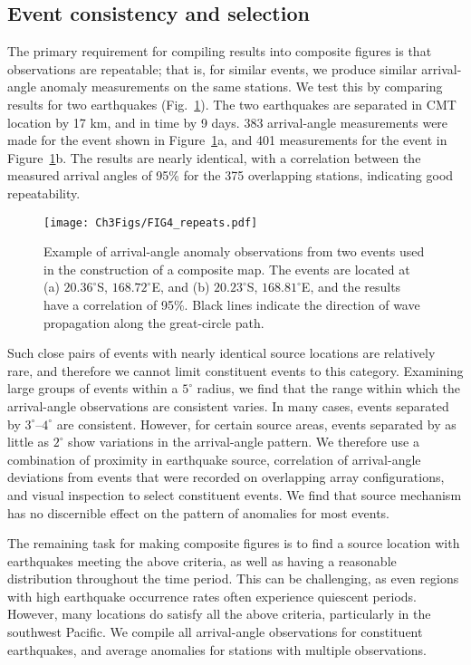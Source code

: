 \documentclass[12pt,oneside]{book}
\newcommand{\degree}[1]{\mbox{$#1^{\circ}$}}
\begin{document}
\subsection{Event consistency and selection}
The primary requirement for compiling results into composite figures is that observations are repeatable; that is, for similar events, we produce similar arrival-angle anomaly measurements on the same stations. We test this by comparing results for two earthquakes (Fig.~\ref{figaa:repeatexample}). The two earthquakes are separated in CMT location by 17 km, and in time by 9 days. 383 arrival-angle measurements were made for the event shown in Figure~\ref{figaa:repeatexample}a, and 401 measurements for the event in Figure~\ref{figaa:repeatexample}b. The results are nearly identical, with a correlation between the measured arrival angles of 95\% for the 375 overlapping stations, indicating good repeatability. 

\begin{figure} 
\begin{center}
\texttt{[image: Ch3Figs/FIG4\_repeats.pdf]} 
\caption[Arrival-angle estimates for similar event locations]{Example of arrival-angle anomaly observations from two events used in the construction of a composite map. The events are located at (a) \degree{20.36}S, \degree{168.72}E, and (b) \degree{20.23}S, \degree{168.81}E, and the results have a correlation of 95\%. Black lines indicate the direction of wave propagation along the great-circle path. }
\label{figaa:repeatexample}
\end{center}
\end{figure}
%

Such close pairs of events with nearly identical source locations are relatively rare, and therefore we cannot limit constituent events to this category. Examining large groups of events within a \degree{5} radius, we find that the range within which the arrival-angle observations are consistent varies. In many cases, events separated by \degree{3}--\degree{4} are consistent. However, for certain source areas, events separated by as little as \degree{2} show variations in the arrival-angle pattern. We therefore use a combination of proximity in earthquake source, correlation of arrival-angle deviations from events that were recorded on overlapping array configurations, and visual inspection to select constituent events. We find that source mechanism has no discernible effect on the pattern of anomalies for most events.

The remaining task for making composite figures is to find a source location with earthquakes meeting the above criteria, as well as having a reasonable distribution throughout the time period. This can be challenging, as even regions with high earthquake occurrence rates often experience quiescent periods. However, many locations do satisfy all the above criteria, particularly in the southwest Pacific. We compile all arrival-angle observations for constituent earthquakes, and average anomalies for stations with multiple observations. 
\end{document}
